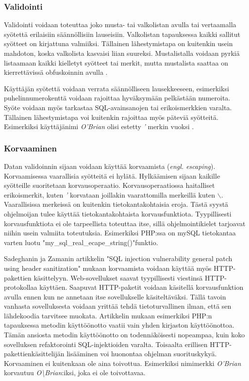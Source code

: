 \documentclass[finnish]{tktltiki2}
\theoremstyle{definition}
\theoremstyle{remark}
\begin{document}
		 \subsubsection{Validointi}
		 Validointi voidaan toteuttaa joko musta- tai valkolistan avulla tai vertaamalla syötettä erilaisiin säännöllisiin lauseisiin. Valkolistan tapauksessa kaikki sallitut syötteet on kirjattuna valmiiksi. Tällainen lähestymistapa on kuitenkin usein mahdoton, koska valkolista kasvaisi liian suureksi. Mustalistalla voidaan pyrkiä listaamaan kaikki kielletyt syötteet tai merkit, mutta mustalista saattaa on kierrettävissä obfuskoinnin avulla \cite{encoding}. 
		
		Käyttäjän syötettä voidaan verrata säännölliseen lausekkeeseen, esimerkiksi puhelinnumerokenttä voidaan rajoittaa hyväksymään pelkästään numeroita. Syöte voidaan myös tarkastaa SQL-avainsanojen tai erikoismerkkien varalta. Tällainen lähestymistapa voi kuitenkin rajoittaa myös päteviä syötteitä. Esimerkiksi käyttäjänimi \textit{O'Brian} olisi estetty \textit{'} merkin vuoksi \cite{generation}.
		
		
		\subsubsection{Korvaaminen}
		Datan validoinnin sijaan voidaan käyttää korvaamista (\textit{engl. escaping}). Korvaamisessa vaarallisia syötteitä ei hylätä. Hylkäämisen sijaan kaikille syötteille suoritetaan korvausoperaatio. Korvausoperaatiossa haitalliset erikoismerkit, kuten \textit{'} korvataan joillakin vaarattomilla merkeillä kuten \textit{$\backslash$}. Vaarallisissa merkeissä on kuitenkin tietokantakohtaisia eroja. Tästä syystä ohjelmoijan tulee käyttää tietokantakohtaista korvausfunktiota. Tyypillisesti korvausfunktiota ei ole tarpeellista toteuttaa itse, sillä ohjelmointikielet tarjoavat niihin usein valmiita toteutuksia. Esimerkiksi PHP:ssa on mySQL tietokantaa varten luotu "my{\_}sql{\_}real{\_}ecape\_string()"\space funktio. 
		
		Sadeghanin ja Zamanin artikkelin "SQL injection vulnerability general patch using header sanitization"\space\cite{prepared} mukaan korvaamista voidaan käyttää myös HTTP-pakettien käsittelyyn. Web-sovellukset saavat tyypillisesti viestinsä HTTP-protokollaa käyttäen. Saapuvat HTTP-paketit voidaan käsitellä korvausfunktion avulla ennen kun ne annetaan itse sovellukselle käsiteltäväksi. Tällä tavoin vanhasta sovelluksesta voidaan yrittää tehdä tietoturvallinen ilman, että sen lähdekoodia tarvitsee muokata. Artikkelin mukaan esimerkiksi PHP:n tapauksessa metodin käyttöönotto vaatii vain yhden kirjaston käyttöönottoa. Tämän ansiosta metodin käyttöönotto on todennäköisesti nopeampaa, kuin koko sovelluksen refaktorointi SQL-injektioiden varalta. Toisaalta erillisen HTTP-pakettienkäsittelijän lisääminen voi huonontaa ohjelman suorituskykyä. Korvaaminen ei kuitenkaan ole aina toivottua. Esimerkiksi nimimerkki \textit{O'Brian} korvautuu \textit{O\textbackslash Brian}:iksi, joka ei ole toivottavaa. 
	
\end{document}
